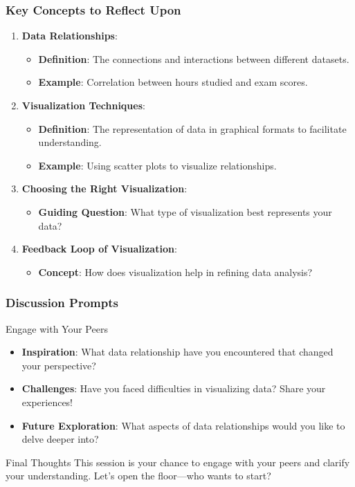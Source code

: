 \documentclass[aspectratio=169]{beamer}
\begin{document}
\begin{frame}[fragile]
    \frametitle{Key Concepts to Reflect Upon}
    \begin{enumerate}
        \item \textbf{Data Relationships}:
            \begin{itemize}
                \item \textbf{Definition}: The connections and interactions between different datasets.
                \item \textbf{Example}: Correlation between hours studied and exam scores.
            \end{itemize}
        \item \textbf{Visualization Techniques}:
            \begin{itemize}
                \item \textbf{Definition}: The representation of data in graphical formats to facilitate understanding.
                \item \textbf{Example}: Using scatter plots to visualize relationships.
            \end{itemize}
        \item \textbf{Choosing the Right Visualization}:
            \begin{itemize}
                \item \textbf{Guiding Question}: What type of visualization best represents your data?
            \end{itemize}
        \item \textbf{Feedback Loop of Visualization}:
            \begin{itemize}
                \item \textbf{Concept}: How does visualization help in refining data analysis?
            \end{itemize}
    \end{enumerate}
\end{frame}

\begin{frame}[fragile]
    \frametitle{Discussion Prompts}
    \begin{block}{Engage with Your Peers}
        \begin{itemize}
            \item \textbf{Inspiration}: What data relationship have you encountered that changed your perspective?
            \item \textbf{Challenges}: Have you faced difficulties in visualizing data? Share your experiences!
            \item \textbf{Future Exploration}: What aspects of data relationships would you like to delve deeper into?
        \end{itemize}
    \end{block}
    \begin{block}{Final Thoughts}
        This session is your chance to engage with your peers and clarify your understanding. Let’s open the floor—who wants to start?
    \end{block}
\end{frame}
\end{document}
